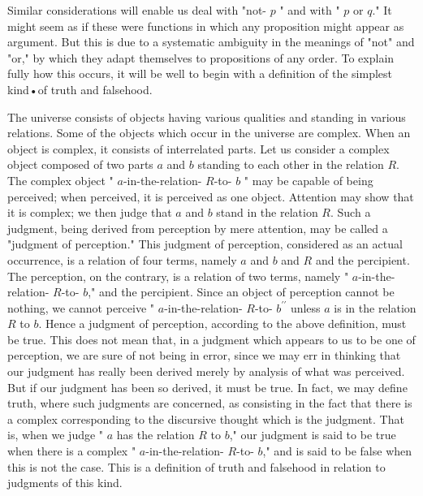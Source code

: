 \documentclass[10pt]{article}
\begin{document}
Similar considerations will enable us deal with "not- $p$ " and with " $p$ or $q$." It might seem as if these were functions in which any proposition might appear as argument. But this is due to a systematic ambiguity in the meanings of "not" and "or," by which they adapt themselves to propositions of any order. To explain fully how this occurs, it will be well to begin with a definition of the simplest kind•of truth and falsehood.

The universe consists of objects having various qualities and standing in various relations. Some of the objects which occur in the universe are complex. When an object is complex, it consists of interrelated parts. Let us consider a complex object composed of two parts $a$ and $b$ standing to each other in the relation $R$. The complex object " $a$-in-the-relation- $R$-to- $b$ " may be capable of being perceived; when perceived, it is perceived as one object. Attention may show that it is complex; we then judge that $a$ and $b$ stand in the relation $R$. Such a judgment, being derived from perception by mere attention, may be called a "judgment of perception." This judgment of perception, considered as an actual occurrence, is a relation of four terms, namely $a$ and $b$ and $R$ and the percipient. The perception, on the contrary, is a relation of two terms, namely " $a$-in-the-relation- $R$-to- $b$," and the percipient. Since an object of perception cannot be nothing, we cannot perceive " $a$-in-the-relation- $R$-to- $b^{\prime \prime}$ unless $a$ is in the relation $R$ to $b$. Hence a judgment of perception, according to the above definition, must be true. This does not mean that, in a judgment which appears to us to be one of perception, we are sure of not being in error, since we may err in thinking that our judgment has really been derived merely by analysis of what was perceived. But if our judgment has been so derived, it must be true. In fact, we may define truth, where such judgments are concerned, as consisting in the fact that there is a complex corresponding to the discursive thought which is the judgment. That is, when we judge " $a$ has the relation $R$ to $b$," our judgment is said to be true when there is a complex " $a$-in-the-relation- $R$-to- $b$," and is said to be false when this is not the case. This is a definition of truth and falsehood in relation to judgments of this kind.
\end{document}
